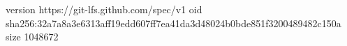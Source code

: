 version https://git-lfs.github.com/spec/v1
oid sha256:32a7a8a3e6313aff19edd607ff7ea41da3d48024b0bde851f3200489482c150a
size 1048672
